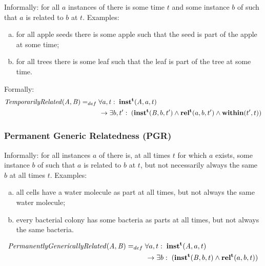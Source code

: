 Informally: for all $a$ instances of  there is some time $t$ and some instance $b$ of
 such that $a$ is related to $b$ at $t$. Examples:
\begin{enumerate}[(a)]
\item for all apple seeds there is
some apple such that the seed is part of the apple at some time;
\item for all
trees there is some leaf such that the leaf is part of the tree at some time.
\end{enumerate}

Formally:
\begin{equation}
\begin{split}
\mathit{TemporarilyRelated}(\mathit{A},\mathit{B}) =_{def}&\;
\forall a, t:\; \mathrm{\mathbf{inst^t}}(\mathit{A}, a, t) \\
&\ \rightarrow
\exists b, t^\prime:\;(\mathrm{\mathbf{inst^t}}(\mathit{B},b,t^\prime) \wedge
\mathrm{\mathbf{rel^t}}(a,b,t^\prime) \wedge \mathrm{\mathbf{within}}(t^\prime,t))
\end{split}
\label{eq:temporarily:cls}
\end{equation}

\subsubsection*{Permanent Generic Relatedness (PGR)}

Informally: for all instances $a$ of  there is, at all times $t$ for which
$a$ exists,
some instance $b$ of  such that $a$ is related to $b$ at $t$, but not necessarily
always the same $b$ at all times $t$. Examples:
\begin{enumerate}[(a)]
\item all cells have a water molecule as
part at all times, but not always the same water molecule;
\item every bacterial colony has some bacteria as parts at all times, but not
always the same bacteria.
\end{enumerate}

\begin{equation}
\begin{split}
\mathit{PermanentlyGenericallyRelated}(\mathit{A},\mathit{B}) =_{def}&\;
\forall a, t:\; \mathrm{\mathbf{inst^t}}(\mathit{A}, a, t) \\
&\ \rightarrow
\exists b:\;(\mathrm{\mathbf{inst^t}}(\mathit{B},b,t) \wedge
\mathrm{\mathbf{rel^t}}(a,b,t))
\end{split}
\label{eq:generically:cls}
\end{equation}

